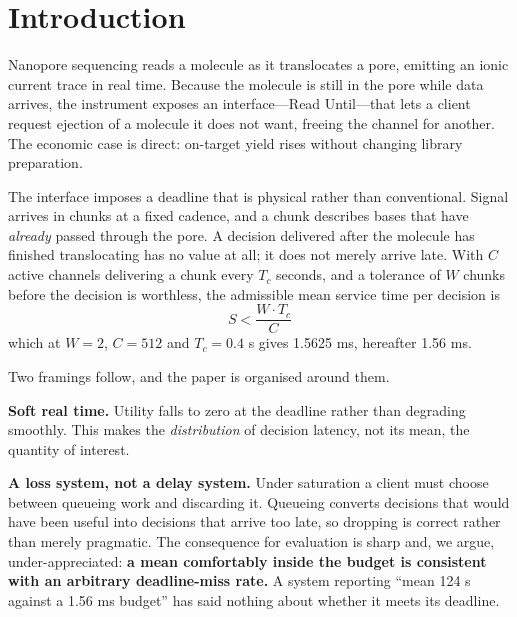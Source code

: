 \documentclass[sigconf,nonacm]{acmart}
\begin{document}

\maketitle

\section{Introduction}

Nanopore sequencing reads a molecule as it translocates a pore, emitting an ionic current trace
in real time. Because the molecule is still in the pore while data arrives, the instrument
exposes an interface---Read Until---that lets a client request ejection of a molecule it does
not want, freeing the channel for another. The economic case is direct: on-target yield rises
without changing library preparation.

The interface imposes a deadline that is physical rather than conventional. Signal arrives in
chunks at a fixed cadence, and a chunk describes bases that have \emph{already} passed through
the pore. A decision delivered after the molecule has finished translocating has no value at
all; it does not merely arrive late. With $C$ active channels delivering a chunk every $T_c$
seconds, and a tolerance of $W$ chunks before the decision is worthless, the admissible mean
service time per decision is
\[ S < \frac{W \cdot T_c}{C} \]
which at $W = 2$, $C = 512$ and $T_c = 0.4$ s gives 1.5625 ms, hereafter 1.56 ms.

Two framings follow, and the paper is organised around them.

\textbf{Soft real time.} Utility falls to zero at the deadline rather than degrading smoothly.
This makes the \emph{distribution} of decision latency, not its mean, the quantity of interest.

\textbf{A loss system, not a delay system.} Under saturation a client must choose between
queueing work and discarding it. Queueing converts decisions that would have been useful into
decisions that arrive too late, so dropping is correct rather than merely pragmatic. The
consequence for evaluation is sharp and, we argue, under-appreciated: \textbf{a mean
comfortably inside the budget is consistent with an arbitrary deadline-miss rate.} A system
reporting ``mean 124 \textmu{}s against a 1.56 ms budget'' has said nothing about whether it meets its
deadline.
\end{document}

